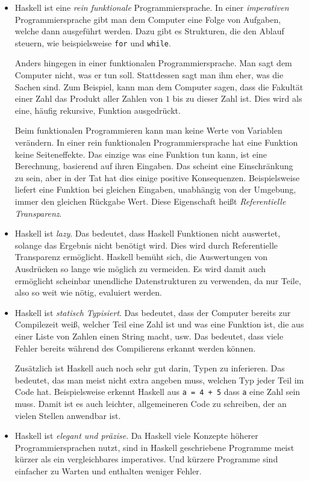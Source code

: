 \begin{itemize}
  \item
Haskell ist eine \emph{rein funktionale} Programmiersprache.
In einer \emph{imperativen} Programmiersprache gibt man dem Computer eine Folge
von Aufgaben, welche dann ausgeführt werden.  Dazu gibt es Strukturen, die den
Ablauf steuern, wie beispielsweise \texttt{for} und \texttt{while}.

Anders hingegen in einer funktionalen Programmiersprache. Man sagt dem Computer
nicht, was er tun soll. Stattdessen sagt man ihm eher, was die Sachen sind.
Zum Beispiel, kann man dem Computer sagen, dass die Fakultät einer Zahl das
Produkt aller Zahlen von $1$ bis zu dieser Zahl ist.
Dies wird als eine, häufig rekursive, Funktion ausgedrückt.

Beim funktionalen Programmieren kann man keine Werte von Variablen verändern.
In einer rein funktionalen Programmiersprache hat eine Funktion keine
Seiteneffekte. Das einzige was eine Funktion tun kann, ist eine Berechnung,
basierend auf ihren Eingaben. Das scheint eine Einschränkung zu sein, aber in
der Tat hat dies einige positive Konsequenzen. Beispielsweise liefert eine
Funktion bei gleichen Eingaben, unabhängig von der Umgebung, immer den gleichen
Rückgabe Wert. Diese Eigenschaft heißt \emph{Referentielle Transparenz}.

  \item
Haskell ist \emph{lazy}.
Das bedeutet, dass Haskell Funktionen nicht auswertet, solange das Ergebnis
nicht benötigt wird. Dies wird durch Referentielle Transparenz ermöglicht.
Haskell bemüht sich, die Auswertungen von Ausdrücken so lange wie möglich zu
vermeiden.
Es wird damit auch ermöglicht scheinbar unendliche Datenstrukturen zu
verwenden, da nur Teile, also so weit wie nötig, evaluiert werden.

  \item
Haskell ist \emph{statisch Typisiert}.
Das bedeutet, dass der Computer bereits zur Compilezeit weiß, welcher Teil eine
Zahl ist und was eine Funktion ist, die aus einer Liste von Zahlen einen String
macht, usw. Das bedeutet, dass viele Fehler bereits während des Compilierens
erkannt werden können.

Zusätzlich ist Haskell auch noch sehr gut darin, Typen zu inferieren. Das
bedeutet, das man meist nicht extra angeben muss, welchen Typ jeder Teil im
Code hat. Beispielsweise erkennt Haskell aus \texttt{a = 4 + 5} dass
\texttt{a} eine Zahl sein muss.
Damit ist es auch leichter, allgemeineren Code zu schreiben, der an vielen
Stellen anwendbar ist.

  \item
Haskell ist \emph{elegant und präzise}.
Da Haskell viele Konzepte höherer Programmiersprachen nutzt, sind in Haskell
geschriebene Programme meist kürzer als ein vergleichbares imperatives. Und
kürzere Programme sind einfacher zu Warten und enthalten weniger Fehler.
\end{itemize}


